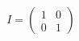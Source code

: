 \documentclass[preview]{standalone}
\begin{document}
\begin{align*}
I = \begin{pmatrix} 1 & 0 \\ 0 & 1 \end{pmatrix}
\end{align*}
\end{document}
